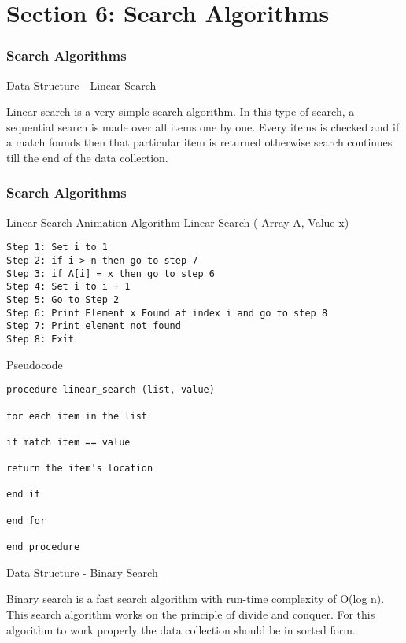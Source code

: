\documentclass{beamer}
\begin{document}
\section{Section 6: Search Algorithms}
\begin{frame}
\frametitle{Search Algorithms}
\large
Data Structure - Linear Search

Linear search is a very simple search algorithm. In this type of search, a sequential search is made over all items one by one. Every items is checked and if a match founds then that particular item is returned otherwise search continues till the end of the data collection.
\end{frame}

\begin{frame}[fragilke]
\frametitle{Search Algorithms}
\large
Linear Search Animation
Algorithm
Linear Search ( Array A, Value x)
\begin{verbatim}
Step 1: Set i to 1
Step 2: if i > n then go to step 7
Step 3: if A[i] = x then go to step 6
Step 4: Set i to i + 1
Step 5: Go to Step 2
Step 6: Print Element x Found at index i and go to step 8
Step 7: Print element not found
Step 8: Exit
\end{verbatim}
\end{frame}

\begin{frame}[fragile]
Pseudocode
\begin{verbatim}
procedure linear_search (list, value)

for each item in the list

if match item == value

return the item's location

end if

end for

end procedure 
\end{verbatim}

\end{frame}
\begin{frame}
Data Structure - Binary Search

Binary search is a fast search algorithm with run-time complexity of O(log n). This search algorithm works on the principle of divide and conquer. For this algorithm to work properly the data collection should be in sorted form.
\end{frame}
\end{document}

